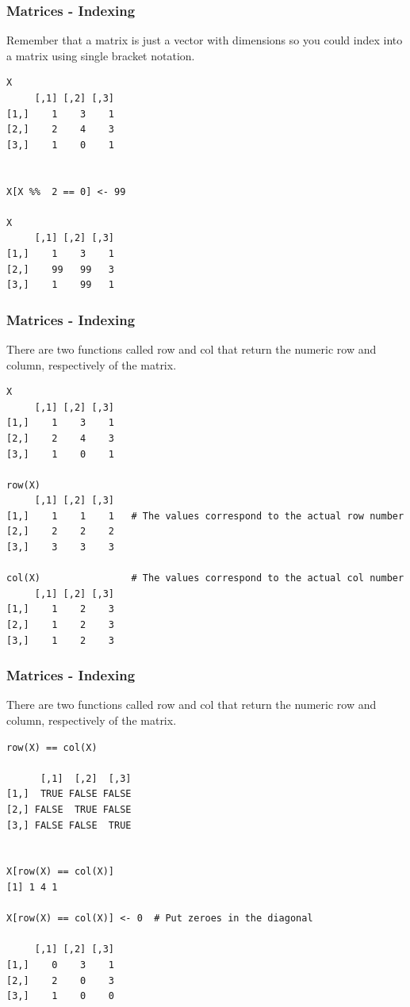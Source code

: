 \documentclass{beamer}
\begin{document}
%

\begin{frame}[fragile]
\frametitle{Matrices - Indexing}
Remember that a matrix is just a vector with dimensions so you could index into a matrix using single bracket notation.
\footnotesize
\begin{verbatim}
X
     [,1] [,2] [,3]
[1,]    1    3    1
[2,]    2    4    3
[3,]    1    0    1


X[X %%  2 == 0] <- 99

X
     [,1] [,2] [,3]
[1,]    1    3    1
[2,]    99   99   3
[3,]    1    99   1
\end{verbatim}
\end{frame}

%

\begin{frame}[fragile]
\frametitle{Matrices - Indexing}
There are two functions called row and col that return the numeric row and column, respectively of the matrix. 
\footnotesize
\begin{verbatim}
X
     [,1] [,2] [,3]
[1,]    1    3    1
[2,]    2    4    3
[3,]    1    0    1

row(X)
     [,1] [,2] [,3]
[1,]    1    1    1   # The values correspond to the actual row number
[2,]    2    2    2
[3,]    3    3    3

col(X)                # The values correspond to the actual col number
     [,1] [,2] [,3]
[1,]    1    2    3
[2,]    1    2    3
[3,]    1    2    3
\end{verbatim}
\end{frame}

%

\begin{frame}[fragile]
\frametitle{Matrices - Indexing}
There are two functions called row and col that return the numeric row and column, respectively of the matrix. 
\footnotesize
\begin{verbatim}
row(X) == col(X)

      [,1]  [,2]  [,3]
[1,]  TRUE FALSE FALSE
[2,] FALSE  TRUE FALSE
[3,] FALSE FALSE  TRUE
 

X[row(X) == col(X)]
[1] 1 4 1

X[row(X) == col(X)] <- 0  # Put zeroes in the diagonal

     [,1] [,2] [,3]
[1,]    0    3    1
[2,]    2    0    3
[3,]    1    0    0

\end{verbatim}
\end{frame}
\end{document}

